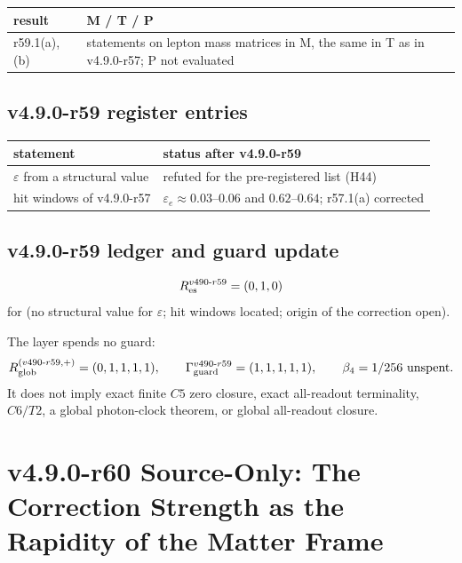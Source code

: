\begin{center}
\small
\begin{tabular}{@{}>{\raggedright\arraybackslash}p{}>{\raggedright\arraybackslash}p{}@{}}
\toprule
result & M / T / P\\
\midrule
r59.1(a), (b) & statements on lepton mass matrices in M, the same in T as in v4.9.0-r57; P not evaluated\\
\bottomrule
\end{tabular}
\end{center}

\subsection*{v4.9.0-r59 register entries}
\label{subsec:v490-r59-register}

\begin{center}
\small
\begin{tabular}{@{}>{\raggedright\arraybackslash}p{}>{\raggedright\arraybackslash}p{}@{}}
\toprule
statement & status after v4.9.0-r59\\
\midrule
\(\varepsilon\) from a structural value & refuted for the pre-registered list (H44)\\
hit windows of v4.9.0-r57 & \(\varepsilon_e\approx0.03\)--\(0.06\) and \(0.62\)--\(0.64\); r57.1(a) corrected\\
\bottomrule
\end{tabular}
\end{center}

\subsection*{v4.9.0-r59 ledger and guard update}
\label{subsec:v490-r59-ledger-guard}

\[
R_{\rm es}^{v490\text{-}r59}=(0,1,0)
\]
for (no structural value for \(\varepsilon\); hit windows located; origin of the correction open).

The layer spends no guard:
\[
R_{\rm glob}^{(v490\text{-}r59,+)}=(0,1,1,1,1),
\qquad
\Gamma_{\rm guard}^{v490\text{-}r59}=(1,1,1,1,1),
\qquad
\beta_4=1/256\ \text{unspent}.
\]
It does not imply exact finite \(C5\) zero closure, exact all-readout terminality,
\(C6/T2\), a global photon-clock theorem, or global all-readout closure.

\clearpage
\section*{v4.9.0-r60 Source-Only: The Correction Strength as the Rapidity of the Matter Frame}
\label{sec:v490-r60-eps-rapidity}

